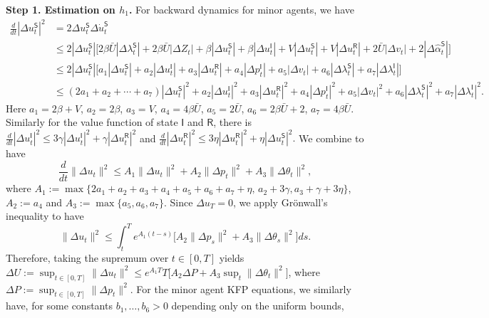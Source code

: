 \documentclass[letterpaper, 10 pt, conference]{ieeeconf}  %
\def\sS{\mathsf{S}}
\def\sI{\mathsf{I}}
\def\sR{\mathsf{R}}
\begin{document}
\textbf{Step 1. Estimation on $h_1$.} For backward dynamics for minor agents, we have
\begin{equation*}
    \begin{aligned}
        \frac{d}{dt}|\Delta u_t^\sS|^2
        &=2\Delta u_t^\sS\Delta\dot{u}_t^\sS \\
        &\leq 2|\Delta u_t^\sS|\Big[2\beta\bar U|\Delta\lambda_t^{\sS}|+2\beta\bar U|\Delta Z_t|+\beta|\Delta u_t^\sS|
        +\beta|\Delta u_t^\sI|+V|\Delta u_t^\sS|+V|\Delta u_t^\sR| + 2\bar{U} |\Delta v_t| +2|\Delta \hat{\alpha}_t^\sS|\Big] \\
        &\leq 2|\Delta u_t^\sS|\Big[a_1|\Delta u_t^\sS|+a_2|\Delta u_t^\sI|+a_3|\Delta u_t^\sR| +a_4|\Delta p_t^\sI|+a_5|\Delta v_t|+a_6|\Delta \lambda_t^{\sS}|+a_7|\Delta \lambda_t^{\sI}|\Big] \\
        &\leq (2a_1+a_2+\cdots+a_7)|\Delta u_t^\sS|^2+a_2|\Delta u_t^\sI|^2 +a_3|\Delta u_t^\sR|^2+a_4|\Delta p_t^\sI|^2+a_5|\Delta v_t|^2+a_6|\Delta \lambda_t^{\sS}|^2+a_7|\Delta \lambda_t^{\sI}|^2.
    \end{aligned}
\end{equation*}
Here
$a_1=2\beta + V$,
$a_2=2\beta$, $a_3=V$,
$a_4=4 \beta \bar{U}$,
$a_5=2\bar{U}$, $a_6=2\beta \bar U+2$,
$a_7=4 \beta \bar{U}$.
Similarly for the value function of state $\sI$ and $\sR$, there is
$
\frac{d}{dt}|\Delta u_t^\sI|^2\leq 3\gamma|\Delta u_t^\sI|^2+\gamma|\Delta u_t^\sR|^2$ and $\frac{d}{dt}|\Delta u_t^\sR|^2\le3\eta|\Delta u_t^\sR|^2+\eta|\Delta u_t^\sS|^2.
$
We combine to have
$$
\frac{d}{dt}\|\Delta u_t\|^2\le A_1\|\Delta u_t\|^2+A_2\|\Delta p_t\|^2+A_3\|\Delta \theta_t\|^2,
$$
where
$A_1:=\max\{2a_1+a_2+a_3+a_4+a_5+a_6+a_7+\eta,\,a_2+3\gamma,a_3+\gamma+3\eta\}$, $A_2:=a_4$ and $A_3 := \max\{a_5, a_6, a_7\}$.
Since $\Delta u_T=0$, we apply Gr\"onwall's inequality to have
\begin{equation*}
        \|\Delta u_t\|^2
        \leq\int_t^T e^{A_1(t-s)}\Big[A_2\|\Delta p_s\|^2+A_3\|\Delta \theta_s\|^2\Big]ds.
\end{equation*}
Therefore, taking the supremum over $t\in[0,T]$ yields $\Delta U:=\sup_{t\in[0,T]}\|\Delta u_t\|^2
\leq e^{A_1T}T\big[A_2 \Delta P+A_3 \sup_t \|\Delta \theta_t\|^2\big]$, where $\Delta P:=\sup_{t\in[0,T]}\|\Delta p_t\|^2$. For the minor agent KFP equations, we similarly have, for some constants $b_1,\dots,b_6>0$ depending only on the uniform bounds,
\end{document}
